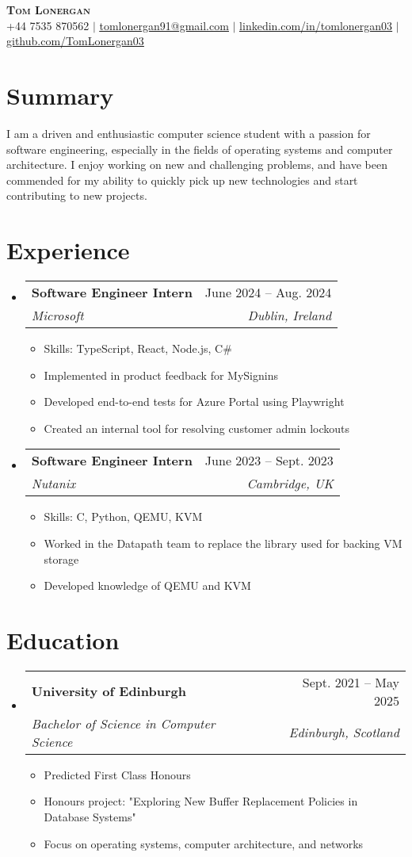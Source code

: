 \documentclass[letterpaper,11pt]{article}
\makeatletter
\newcommand{\resumeItem}[1]{
  \item\small{
    {#1 \vspace{-2pt}}
  }
}
\newcommand{\resumeSubheading}[4]{
  \vspace{-2pt}\item
    \begin{tabular*}{0.97\textwidth}[t]{l@{\extracolsep{\fill}}r}
      \textbf{#1} & #2 \\
      \textit{\small#3} & \textit{\small #4} \\
    \end{tabular*}\vspace{-7pt}
}
\newcommand{\resumeSubHeadingListStart}{\begin{itemize}[leftmargin=0.15in, label={}]}
\newcommand{\resumeSubHeadingListEnd}{\end{itemize}}
\newcommand{\resumeItemListStart}{\begin{itemize}}
\newcommand{\resumeItemListEnd}{\end{itemize}\vspace{-5pt}}
\makeatother
\begin{document}
\begin{center}
    \textbf{\Huge \scshape Tom Lonergan} \\ \vspace{1pt}
    \small +44 7535 870562 $|$ \href{mailto:tomlonergan91@gmail.com}{\underline{tomlonergan91@gmail.com}} $|$ 
    \href{https://linkedin.com/in/tomlonergan03}{\underline{linkedin.com/in/tomlonergan03}} $|$
    \href{https://github.com/TomLonergan03}{\underline{github.com/TomLonergan03}}
\end{center}

\section{Summary}
I am a driven and enthusiastic computer science student with a passion for software engineering, especially in the fields of operating systems and computer architecture. I enjoy working on new and challenging problems, and have been commended for my ability to quickly pick up new technologies and start contributing to new projects.

\section{Experience}
  \resumeSubHeadingListStart

    \resumeSubheading
      {Software Engineer Intern}{June 2024 -- Aug. 2024}
      {Microsoft}{Dublin, Ireland}
      \resumeItemListStart
        \resumeItem{Skills: TypeScript, React, Node.js, C\#}
        \resumeItem{Implemented in product feedback for MySignins}
        \resumeItem{Developed end-to-end tests for Azure Portal using Playwright}
        \resumeItem{Created an internal tool for resolving customer admin lockouts}
      \resumeItemListEnd

    \resumeSubheading
      {Software Engineer Intern}{June 2023 -- Sept. 2023}
      {Nutanix}{Cambridge, UK}
      \resumeItemListStart
        \resumeItem{Skills: C, Python, QEMU, KVM}
        \resumeItem{Worked in the Datapath team to replace the library used for backing VM storage}
        \resumeItem{Developed knowledge of QEMU and KVM}
    \resumeItemListEnd

  \resumeSubHeadingListEnd

\section{Education}
  \resumeSubHeadingListStart
    \resumeSubheading
      {University of Edinburgh}{Sept. 2021 -- May 2025}
      {Bachelor of Science in Computer Science}{Edinburgh, Scotland}
      \resumeItemListStart
        \resumeItem{Predicted First Class Honours}
        \resumeItem{Honours project: "Exploring New Buffer Replacement Policies in Database Systems"}
        \resumeItem{Focus on operating systems, computer architecture, and networks}
      \resumeItemListEnd
  \resumeSubHeadingListEnd
\end{document}
